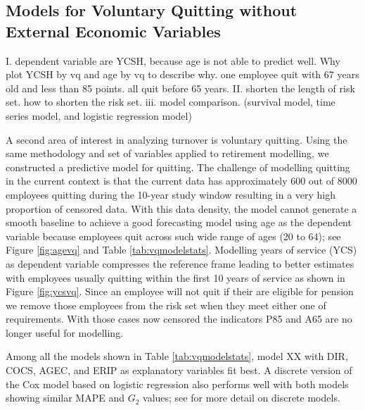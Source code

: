 \documentclass[12pt,letterpaper]{article}
\begin{document}
\subsection{Models for Voluntary Quitting without External Economic Variables}

I. dependent variable are YCSH, because age is not able to predict well. Why plot YCSH by vq and age by vq to describe why.
one employee quit with 67 years old and less than 85 points. all quit before 65 years.
II. shorten the length of risk set. how to shorten the risk set.
iii. model comparison. (survival model, time series model, and logistic regression model)

A second area of interest in analyzing turnover is voluntary quitting.  Using the same methodology and set of variables applied to retirement modelling, we constructed a predictive model for quitting. The challenge of modelling quitting in the current context is that the current data has approximately 600 out of 8000 employees quitting during the 10-year study window resulting in a very high proportion of censored data.  With this data density, the model cannot generate a smooth baseline to achieve a good forecasting model using age as the dependent variable because employees quit across such wide range of ages (20 to 64); see Figure \ref{fig:agevq} and Table \ref{tab:vqmodelstats}.  Modelling years of service (YCS) as dependent variable compresses the reference frame leading to better estimates with employees usually quitting within the first 10 years of service as shown in Figure \ref{fig:ycsvq}. Since an employee will not quit if their are eligible for pension we remove those employees from the risk set when they meet either one of requirements.  With those cases now censored the indicators P85 and A65 are no longer useful for modelling.

Among all the models shown in Table \ref{tab:vqmodelstats}, model XX with DIR, COCS, AGEC, and ERIP as explanatory variables fit best.  A discrete version of the Cox model based on logistic regression also performs well with both models showing similar MAPE and $G_2$ values; see \citet{allison2010} for more detail on discrete models. 
\end{document}
